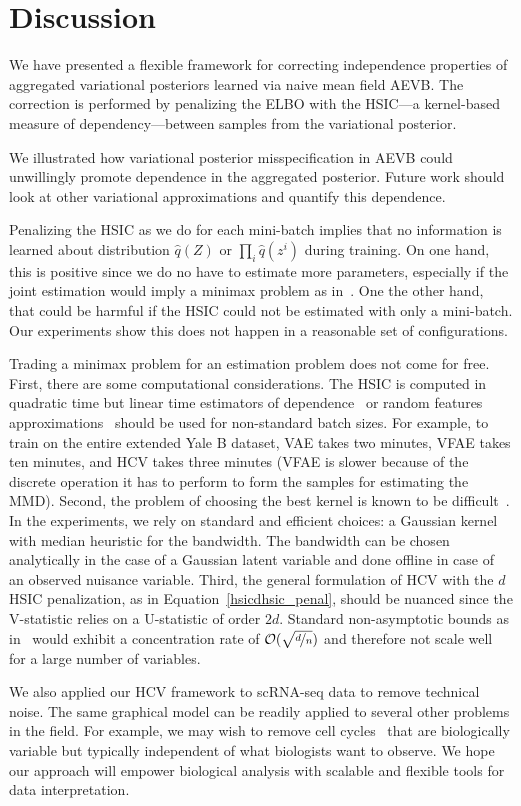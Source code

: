 \section{Discussion}
We have presented a flexible framework for correcting independence properties of aggregated variational posteriors learned via naive mean field AEVB. The correction is performed by penalizing the ELBO with the HSIC---a kernel-based measure of dependency---between samples from the variational posterior. 

We illustrated how variational posterior misspecification in AEVB could unwillingly promote dependence in the aggregated posterior. Future work should look at other variational approximations and quantify this dependence. 

Penalizing the HSIC as we do for each mini-batch implies that no information is learned about distribution $\hat{q}(Z)$ or $\prod_i{\hat{q}(z^i)}$ during training. On one hand, this is positive since we do no have to estimate more parameters, especially if the joint estimation would imply a minimax problem as in~\cite{Kim2018, Makhzani2015}. One the other hand, that could be harmful if the HSIC could not be estimated with only a mini-batch. Our experiments show this does not happen in a reasonable set of configurations.

Trading a minimax problem for an estimation problem does not come for free. First, there are some computational considerations. The HSIC is computed in quadratic time but linear time estimators of dependence~\cite{Jitkrittum2016} or random features approximations~\cite{Perez-Suay2018} should be used for non-standard batch sizes. For example, to train on the entire extended Yale B dataset, VAE takes two minutes, VFAE takes ten minutes, and HCV takes three minutes (VFAE is slower because of the discrete operation it has to perform to form the samples for estimating the MMD). Second, the problem of choosing the best kernel is known to be difficult~\cite{Flaxman2016}. In the experiments, we rely on standard and efficient choices: a Gaussian kernel with median heuristic for the bandwidth. The bandwidth can be chosen analytically in the case of a Gaussian latent variable and done offline in case of an observed nuisance variable. Third, the general formulation of HCV with the $d$HSIC penalization, as in Equation~\ref{hsicdhsic_penal}, should be nuanced since the V-statistic relies on a U-statistic of order $2d$. Standard non-asymptotic bounds as in~\cite{Gretton2005} would exhibit a concentration rate of $\mathcal{O}(\sqrt{\nicefrac{d}{n}})$ and therefore not scale well for a large number of variables.

We also applied our HCV framework to scRNA-seq data to remove technical noise. The same graphical model can be readily applied to several other problems in the field. For example, we may wish to remove cell cycles~\cite{Florian2015} that are biologically variable but typically independent of what biologists want to observe. We hope our approach will empower biological analysis with scalable and flexible tools for data interpretation.